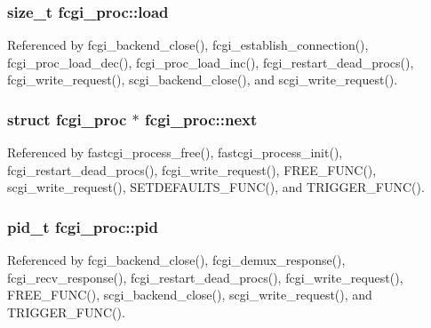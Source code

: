 \hypertarget{structfcgi__proc_a05b2d9a997b4fd3c8bf3e3895dd9be80}{
\subsubsection[{load}]{\setlength{\rightskip}{0pt plus 5cm}size\-\_\-t fcgi\-\_\-proc\-::load}}\label{structfcgi__proc_a05b2d9a997b4fd3c8bf3e3895dd9be80}


Referenced by fcgi\-\_\-backend\-\_\-close(), fcgi\-\_\-establish\-\_\-connection(), fcgi\-\_\-proc\-\_\-load\-\_\-dec(), fcgi\-\_\-proc\-\_\-load\-\_\-inc(), fcgi\-\_\-restart\-\_\-dead\-\_\-procs(), fcgi\-\_\-write\-\_\-request(), scgi\-\_\-backend\-\_\-close(), and scgi\-\_\-write\-\_\-request().

\hypertarget{structfcgi__proc_ae9352306bd801817471d2916ed9acd72}{
\subsubsection[{next}]{\setlength{\rightskip}{0pt plus 5cm}struct {\bf fcgi\-\_\-proc} $\ast$ fcgi\-\_\-proc\-::next}}\label{structfcgi__proc_ae9352306bd801817471d2916ed9acd72}


Referenced by fastcgi\-\_\-process\-\_\-free(), fastcgi\-\_\-process\-\_\-init(), fcgi\-\_\-restart\-\_\-dead\-\_\-procs(), fcgi\-\_\-write\-\_\-request(), F\-R\-E\-E\-\_\-\-F\-U\-N\-C(), scgi\-\_\-write\-\_\-request(), S\-E\-T\-D\-E\-F\-A\-U\-L\-T\-S\-\_\-\-F\-U\-N\-C(), and T\-R\-I\-G\-G\-E\-R\-\_\-\-F\-U\-N\-C().

\hypertarget{structfcgi__proc_ac6034bb71c68b16698ba98a75cd355c7}{
\subsubsection[{pid}]{\setlength{\rightskip}{0pt plus 5cm}pid\-\_\-t fcgi\-\_\-proc\-::pid}}\label{structfcgi__proc_ac6034bb71c68b16698ba98a75cd355c7}


Referenced by fcgi\-\_\-backend\-\_\-close(), fcgi\-\_\-demux\-\_\-response(), fcgi\-\_\-recv\-\_\-response(), fcgi\-\_\-restart\-\_\-dead\-\_\-procs(), fcgi\-\_\-write\-\_\-request(), F\-R\-E\-E\-\_\-\-F\-U\-N\-C(), scgi\-\_\-backend\-\_\-close(), scgi\-\_\-write\-\_\-request(), and T\-R\-I\-G\-G\-E\-R\-\_\-\-F\-U\-N\-C().

